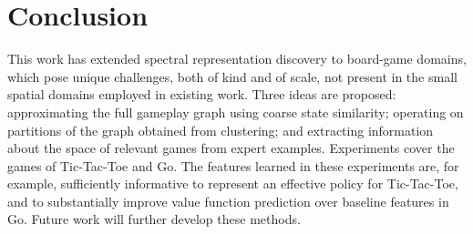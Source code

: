 \section{Conclusion}

This work has extended spectral representation discovery to board-game domains,
which pose unique challenges, both of kind and of scale, not present in the
small spatial domains employed in existing work. Three ideas are proposed:
approximating the full gameplay graph using coarse state similarity; operating
on partitions of the graph obtained from clustering; and extracting information
about the space of relevant games from expert examples. Experiments cover the
games of Tic-Tac-Toe and Go. The features learned in these experiments are, for
example, sufficiently informative to represent an effective policy for
Tic-Tac-Toe, and to substantially improve value function prediction over
baseline features in Go. Future work will further develop these methods.

